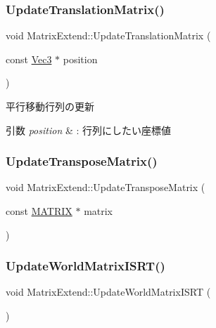 \subsubsection{\texorpdfstring{Update\+Translation\+Matrix()}{UpdateTranslationMatrix()}}
{\footnotesize\ttfamily void Matrix\+Extend\+::\+Update\+Translation\+Matrix (\begin{DoxyParamCaption}\item[{const \mbox{\hyperlink{_vector3_d_8h_ab16f59e4393f29a01ec8b9bbbabbe65d}{Vec3}} $\ast$}]{position }\end{DoxyParamCaption})\hspace{0.3cm}{\ttfamily [inline]}}



平行移動行列の更新 


\begin{DoxyParams}{引数}
{\em position} & \+: 行列にしたい座標値 \\
\hline
\end{DoxyParams}
\mbox{\label{class_matrix_extend_a81e92fe4305ff9569809b61e2e92df31}} 
\subsubsection{\texorpdfstring{Update\+Transpose\+Matrix()}{UpdateTransposeMatrix()}}
{\footnotesize\ttfamily void Matrix\+Extend\+::\+Update\+Transpose\+Matrix (\begin{DoxyParamCaption}\item[{const \mbox{\hyperlink{_vector3_d_8h_a032295cd9fb1b711757c90667278e744}{M\+A\+T\+R\+IX}} $\ast$}]{matrix }\end{DoxyParamCaption})\hspace{0.3cm}{\ttfamily [inline]}}

\mbox{\label{class_matrix_extend_ab0aaf14f8621fde91f9db5537a4187e6}} 
\subsubsection{\texorpdfstring{Update\+World\+Matrix\+I\+S\+R\+T()}{UpdateWorldMatrixISRT()}}
{\footnotesize\ttfamily void Matrix\+Extend\+::\+Update\+World\+Matrix\+I\+S\+RT (\begin{DoxyParamCaption}{ }\end{DoxyParamCaption})\hspace{0.3cm}{\ttfamily [inline]}}

